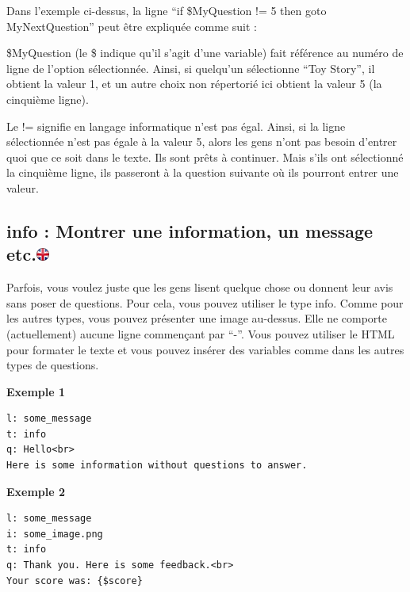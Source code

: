 \documentclass[
]{book}
\begin{document}
Dans l'exemple ci-dessus, la ligne ``if \$MyQuestion != 5 then goto MyNextQuestion'' peut être expliquée comme suit :

\$MyQuestion (le \$ indique qu'il s'agit d'une variable) fait référence au numéro de ligne de l'option sélectionnée. Ainsi, si quelqu'un sélectionne ``Toy Story'', il obtient la valeur 1, et un autre choix non répertorié ici obtient la valeur 5 (la cinquième ligne).

Le != signifie en langage informatique n'est pas égal. Ainsi, si la ligne sélectionnée n'est pas égale à la valeur 5, alors les gens n'ont pas besoin d'entrer quoi que ce soit dans le texte. Ils sont prêts à continuer. Mais s'ils ont sélectionné la cinquième ligne, ils passeront à la question suivante où ils pourront entrer une valeur.

\hypertarget{info-montrer-une-information-un-message-etc.}{%
\subsection[info : Montrer une information, un message etc.]{\texorpdfstring{info : Montrer une information, un message etc.\href{https://www.psytoolkit.org/doc3.4.0/online-survey-syntax.html\#info}{\protect\includegraphics{img/ukflag.png}}}{info : Montrer une information, un message etc.}}\label{info-montrer-une-information-un-message-etc.}}

Parfois, vous voulez juste que les gens lisent quelque chose ou donnent leur avis sans poser de questions. Pour cela, vous pouvez utiliser le type info. Comme pour les autres types, vous pouvez présenter une image au-dessus. Elle ne comporte (actuellement) aucune ligne commençant par ``-''. Vous pouvez utiliser le HTML pour formater le texte et vous pouvez insérer des variables comme dans les autres types de questions.

\textbf{Exemple 1}

\begin{verbatim}
l: some_message
t: info
q: Hello<br>
Here is some information without questions to answer.
\end{verbatim}

\textbf{Exemple 2}

\begin{verbatim}
l: some_message
i: some_image.png
t: info
q: Thank you. Here is some feedback.<br>
Your score was: {$score}
\end{verbatim}
\end{document}
